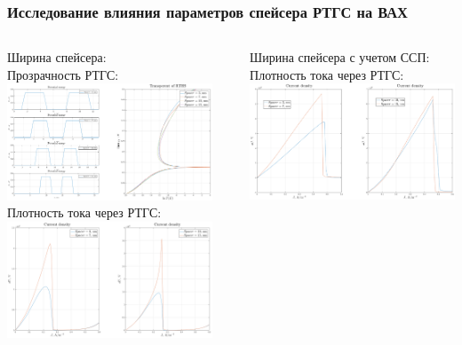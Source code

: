 \documentclass[10pt,pdf,hyperref={unicode},aspectratio={169}]{beamer}
\begin{document}
\begin{frame}
	\frametitle{Исследование влияния параметров спейсера РТГС на ВАХ}
	\begin{columns}
		{\color{blue} Ширина спейсера:}\\
		{\color{red} Прозрачность РТГС:}
	   	\includegraphics[width=.86\linewidth,center]{assets/qslt}\\
		{\color{red} Плотность тока через РТГС:}
	   	\includegraphics[width=.86\linewidth,center]{assets/qslj}
		\rule[-55mm]{0.2ex}{75mm}
		{\color{blue} Ширина спейсера с учетом ССП:}\\
		{\color{red} Плотность тока через РТГС:}
	   	\includegraphics[width=.88\linewidth,center]{assets/qslqj}
	   	\\[39mm]
		{\color{red} }
	\end{columns}
\end{frame}
\end{document}
